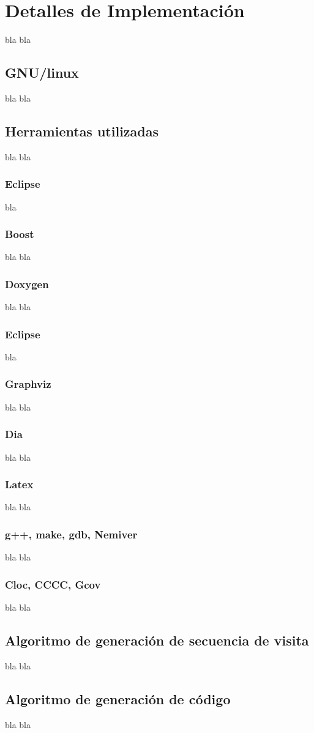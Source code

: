 \chapter{Detalles de Implementaci\'on}
\label{chap:implem}
\minitoc


bla bla

\section{GNU/linux}

bla bla

\section{Herramientas utilizadas}
bla bla
\subsection{Eclipse}
bla 
\subsection{Boost}
bla bla
\subsection{Doxygen}
bla bla
\subsection{Eclipse}
bla 
\subsection{Graphviz}
bla bla
\subsection{Dia}
bla bla

\subsection{Latex}
bla bla
\subsection{g++, make, gdb, Nemiver}
bla bla
\subsection{Cloc, CCCC, Gcov}
bla bla
\section{Algoritmo de generaci\'on de secuencia de visita}

bla bla
\section{Algoritmo de generaci\'on de c\'odigo}
bla bla
